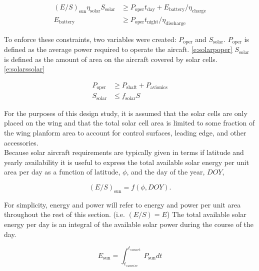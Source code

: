 \documentclass[]{aiaa-tc}%
\begin{document}
    \begin{align}
        \label{e:solarreq}
        (E/S)_{\text{sun}} \eta_{\text{solar}} S_{\text{solar}} &\geq P_{\text{oper}}t_{\text{day}} + E_{\text{battery}}/\eta_{\text{charge}} \\
        \label{e:solarbatt}
        E_{\text{battery}} &\geq P_{\text{oper}}t_{\text{night}}/\eta_{\text{discharge}}
    \end{align}
    
    To enforce these constraints, two variables were created: $P_{\text{oper}}$ and $S_{\text{solar}}$. 
    $P_{\text{oper}}$ is defined as the average power required to operate the aircaft. \eqref{e:solarpoper} 
    $S_{\text{solar}}$ is defined as the amount of area on the aircraft covered by solar cells. \eqref{e:solarssolar}

    \begin{align}
        \label{e:solarpoper}
        P_{\text{oper}} &\geq P_{\text{shaft}} + P_{\text{avionics}} \\
        \label{e:solarssolar}
        S_{\text{solar}} &\leq f_{\text{solar}}S
    \end{align}

    For the purposes of this design study, it is assumed that the solar cells are only placed on the wing and that the total solar cell area is limited to some fraction of the wing planform area to account for control surfaces, leading edge, and other accessories.  \\

    Because solar aircraft requirements are typically given in terms if latitude and yearly availability it is useful to express the total available solar energy per unit area per day as a function of latitude, $\phi$, and the day of the year, $DOY$, 
    
    \begin{equation}
        \label{e:solarfunc}
        (E/S)_{\text{sun}} = f(\phi, DOY).
    \end{equation}


    For simplicity, energy and power will refer to energy and power per unit area throughout the rest of this section. (i.e. $(E/S) = E$) The total available solar energy per day is an integral of the available solar power during the course of the day.

    \begin{equation}
        \label{e:solares}
        E_{\text{sun}} = \int_{t_{sunrise}}^{t_{sunset}} P_{\text{sun}} dt
    \end{equation}
\end{document}
